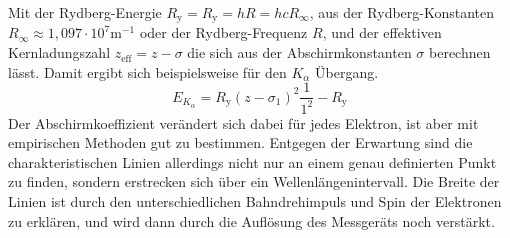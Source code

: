 Mit der Rydberg-Energie $R_{\text{y}} = R_{\text{y}} = hR = hcR_{\infty}$, aus der Rydberg-Konstanten $R_{\infty} ≈ 1,097 \cdot 10^{7} \text{m}^{-1}$  oder der Rydberg-Frequenz $R$, und der effektiven Kernladungszahl $z_{\text{eff}} = z-\sigma$ die sich aus der Abschirmkonstanten $\sigma$ berechnen lässt.
Damit ergibt sich beispielsweise für den $K_{\alpha}$ Übergang.
\begin{equation*}
    E_{K_{\alpha}}= R_{\text{y}}(z-\sigma_1)^2 \frac{1}{1^2} - R_{\text{y}}
\end{equation*}
Der Abschirmkoeffizient verändert sich dabei für jedes Elektron, ist aber mit empirischen Methoden gut zu bestimmen.
Entgegen der Erwartung sind die charakteristischen Linien allerdings nicht nur an einem genau definierten Punkt zu finden, sondern erstrecken sich über ein Wellenlängenintervall.
Die Breite der Linien ist durch den unterschiedlichen Bahndrehimpuls und Spin der Elektronen zu erklären, und wird dann durch die Auflösung des Messgeräts noch verstärkt.


